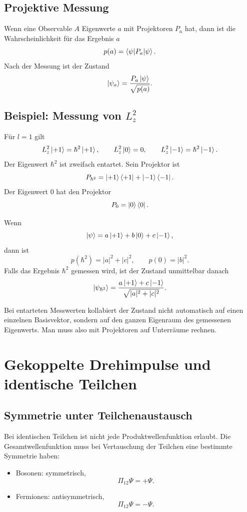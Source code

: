 \subsection{Projektive Messung}

Wenn eine Observable \(A\) Eigenwerte \(a\) mit Projektoren \(P_a\) hat, dann ist die Wahrscheinlichkeit für das Ergebnis \(a\)
\[
    p(a)=\left\langle\psi\middle|P_a\middle|\psi\right\rangle.
\]
Nach der Messung ist der Zustand
\[
    \left|\psi_a\right\rangle=\frac{P_a\left|\psi\right\rangle}{\sqrt{p(a)}}.
\]

\subsection{Beispiel: Messung von \texorpdfstring{\(L_z^2\)}{Lz squared}}

Für \(l=1\) gilt
\[
    L_z^2\left|+1\right\rangle=\hbar^2\left|+1\right\rangle,
    \qquad
    L_z^2\left|0\right\rangle=0,
    \qquad
    L_z^2\left|-1\right\rangle=\hbar^2\left|-1\right\rangle.
\]
Der Eigenwert \(\hbar^2\) ist zweifach entartet. Sein Projektor ist
\[
    P_{\hbar^2}=\left|+1\right\rangle\left\langle+1\right|+\left|-1\right\rangle\left\langle-1\right|.
\]
Der Eigenwert \(0\) hat den Projektor
\[
    P_0=\left|0\right\rangle\left\langle0\right|.
\]

Wenn
\[
    \left|\psi\right\rangle=a\left|+1\right\rangle+b\left|0\right\rangle+c\left|-1\right\rangle,
\]
dann ist
\[
    p(\hbar^2)=|a|^2+|c|^2,
    \qquad
    p(0)=|b|^2.
\]
Falls das Ergebnis \(\hbar^2\) gemessen wird, ist der Zustand unmittelbar danach
\[
    \left|\psi_{\hbar^2}\right\rangle
    =\frac{a\left|+1\right\rangle+c\left|-1\right\rangle}{\sqrt{|a|^2+|c|^2}}.
\]

\begin{notebox}
Bei entarteten Messwerten kollabiert der Zustand nicht automatisch auf einen einzelnen Basisvektor, sondern auf den ganzen Eigenraum des gemessenen Eigenwerts. Man muss also mit Projektoren auf Unterräume rechnen.
\end{notebox}

\section{Gekoppelte Drehimpulse und identische Teilchen}

\subsection{Symmetrie unter Teilchenaustausch}

Bei identischen Teilchen ist nicht jede Produktwellenfunktion erlaubt. Die Gesamtwellenfunktion muss bei Vertauschung der Teilchen eine bestimmte Symmetrie haben:
\begin{itemize}
    \item Bosonen: symmetrisch,
    \[
        \Pi_{12}\Psi=+\Psi.
    \]
    \item Fermionen: antisymmetrisch,
    \[
        \Pi_{12}\Psi=-\Psi.
    \]
\end{itemize}


